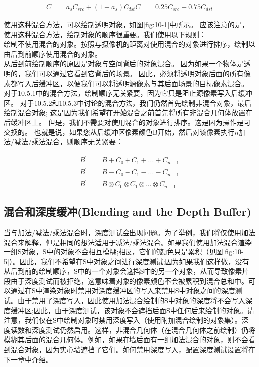 \begin{align*}
C&=a_{s}C_{src}+(1-a_{s})C_{dst}
C&=0.25C_{src}+0.75C_{dst}
\end{align*}

\begin{flushleft}
使用这种混合方法，可以绘制透明对象，如图\ref{fig:10-1}中所示。 应该注意的是，使用这种混合方法，绘制对象的顺序很重要。我们使用以下规则：\\

绘制不使用混合的对象。按照与摄像机的距离对使用混合的对象进行排序，绘制以由后到前顺序使用混合的对象。\\

从后到前绘制顺序的原因是对象与空间背后的对象混合。 因为如果一个物体是透明的，我们可以通过它看到它背后的场景。 因此，必须将透明对象后面的所有像素都写入后缓冲区，以便我们可以将透明源像素与其后面场景的目标像素混合。\\

对于10.5.1中的混合方法，绘制顺序无关紧要，因为它只是阻止源像素写入后缓冲区。 对于10.5.2和10.5.3中讨论的混合方法，我们仍然首先绘制非混合对象，最后绘制混合对象; 这是因为我们希望在开始混合之前首先将所有非混合几何体放置在后缓冲区上。 但是，我们不需要对使用混合的对象进行排序。这是因为操作是可交换的。 也就是说，如果您从后缓冲区像素颜色B开始，然后对该像素执行$n$加法/减法/乘法混合，则顺序无关紧要：\\
\end{flushleft}

\begin{align*}
B^{'}&=B+C_{0}+C_{1}+...+C_{n-1}\\
B^{'}&=B-C_{0}-C_{1}-...-C_{n-1}\\
B^{'}&=B\otimes C_{0}\otimes C_{1}\otimes ...\otimes C_{n-1}
\end{align*}

\subsection{混合和深度缓冲(Blending and the Depth Buffer)}
\begin{flushleft}
当与加法/减法/乘法混合时，深度测试会出现问题。为了举例，我们将仅使用加法混合来解释，但是相同的想法适用于减法/乘法混合。如果我们使用加法混合渲染一组S对象，S中的对象不会相互模糊;相反，它们的颜色只是累积（见图\ref{fig:10-5}）。因此，我们不希望在S中对象之间进行深度测试;因为如果我们这样做，没有从后到前的绘制顺序，S中的一个对象会遮挡S中的另一个对象，从而导致像素片段由于深度测试而被拒绝，这意味着对象的像素颜色不会被累积到混合总和中。可以通过在S中渲染对象时禁用对深度缓冲区的写入来禁用S中对象之间的深度测试。由于禁用了深度写入，因此使用加法混合绘制的S中对象的深度将不会写入深度缓冲区;因此，由于深度测试，该对象不会遮挡后面S中任何后来绘制的对象。请注意，我们仅在S中绘制对象时禁用深度写入（使用附加混合绘制的对象集）。深度读数和深度测试仍然启用。这样，非混合几何体（在混合几何体之前绘制）仍将模糊其后面的混合几何体。例如，如果在墙后面有一组加法混合的对象，则不会看到混合对象，因为实心墙遮挡了它们。如何禁用深度写入，配置深度测试设置将在下一章中介绍。
\end{flushleft}

